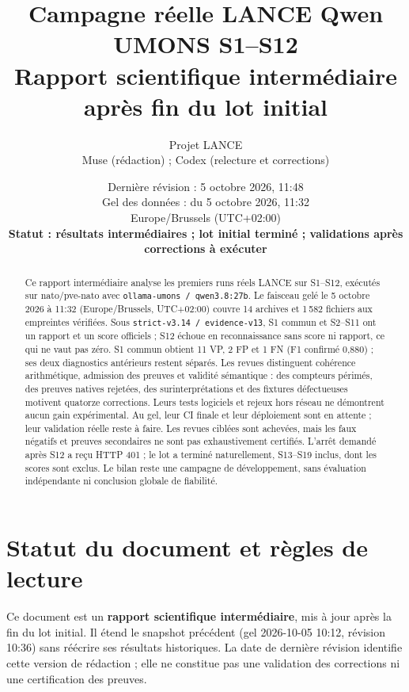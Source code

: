 \documentclass[11pt,a4paper]{article}
\title{Campagne r\'eelle LANCE Qwen UMONS S1--S12\\\large Rapport scientifique interm\'ediaire apr\`es fin du lot initial}
\author{Projet LANCE\\\small Muse (r\'edaction) ; Codex (relecture et corrections)}
\date{Derni\`ere r\'evision : 5 octobre 2026, 11:48\\Gel des donn\'ees : \code{authoritative-evidence.json} du 5 octobre 2026, 11:32\\Europe/Brussels (UTC+02:00)\\\textbf{Statut : r\'esultats interm\'ediaires ; lot initial termin\'e ; validations apr\`es corrections \`a ex\'ecuter}}
\newcommand{\code}[1]{{\urlstyle{tt}\nolinkurl{#1}}}
\begin{document}
\maketitle
\begin{abstract}
Ce rapport intermédiaire analyse les premiers runs réels LANCE sur S1--S12, exécutés sur nato/pve-nato avec \code{ollama-umons / qwen3.8:27b}. Le faisceau gelé le 5 octobre 2026 à 11:32 (Europe/Brussels, UTC+02:00) couvre 14 archives et 1\,582 fichiers aux empreintes vérifiées. Sous \code{strict-v3.14 / evidence-v13}, S1 commun et S2--S11 ont un rapport et un score officiels ; S12 échoue en reconnaissance sans score ni rapport, ce qui ne vaut pas zéro. S1 commun obtient 11 VP, 2 FP et 1 FN (F1 confirmé 0,880) ; ses deux diagnostics antérieurs restent séparés. Les revues distinguent cohérence arithmétique, admission des preuves et validité sémantique : des compteurs périmés, des preuves natives rejetées, des surinterprétations et des fixtures défectueuses motivent quatorze corrections. Leurs tests logiciels et rejeux hors réseau ne démontrent aucun gain expérimental. Au gel, leur CI finale et leur déploiement sont en attente ; leur validation réelle reste à faire. Les revues ciblées sont achevées, mais les faux négatifs et preuves secondaires ne sont pas exhaustivement certifiés. L'arrêt demandé après S12 a reçu HTTP 401 ; le lot a terminé naturellement, S13--S19 inclus, dont les scores sont exclus. Le bilan reste une campagne de développement, sans évaluation indépendante ni conclusion globale de fiabilité.
\end{abstract}
\clearpage
\setcounter{tocdepth}{2}
{\small\setlength{\parskip}{0pt}\tableofcontents}
\clearpage
\section{Statut du document et r\`egles de lecture}
\label{sec:statut}
Ce document est un \textbf{rapport scientifique interm\'ediaire}, mis \`a jour apr\`es la fin du lot initial. Il \'etend le snapshot pr\'ec\'edent (gel 2026-10-05 10:12, r\'evision 10:36) sans r\'e\'ecrire ses r\'esultats historiques. La date de derni\`ere r\'evision identifie cette version de r\'edaction ; elle ne constitue pas une validation des corrections ni une certification des preuves.
\end{document}
